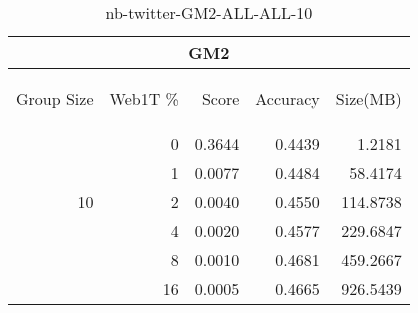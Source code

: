 \begin{center}
\begin{table}[htbp] 
 \begin{center}
\begin{tabular}{ | r | r | r | r | r |}
\hline
\multicolumn{5}{|c|}{GM2}\\
\hline
\begin{sideways}Group Size\end{sideways} & \begin{sideways}Web1T \%\end{sideways} & \begin{sideways}Score\end{sideways} & \begin{sideways}Accuracy\end{sideways} & \begin{sideways}Size(MB)\end{sideways}\\
\hline
\multirow{5}{*}{10}
 & 0 & 0.3644 & 0.4439 & 1.2181\\ \cline{2-5}
 & 1 & 0.0077 & 0.4484 & 58.4174\\ \cline{2-5}
 & 2 & 0.0040 & 0.4550 & 114.8738\\ \cline{2-5}
 & 4 & 0.0020 & 0.4577 & 229.6847\\ \cline{2-5}
 & 8 & 0.0010 & 0.4681 & 459.2667\\ \cline{2-5}
 & 16 & 0.0005 & 0.4665 & 926.5439\\ \cline{2-5}
\hline
\end{tabular}
\caption{nb-twitter-GM2-ALL-ALL-10}
\label{table:nb-twitter-GM2-ALL-ALL-10}
\end{center}
 \end{table}
\end{center}

